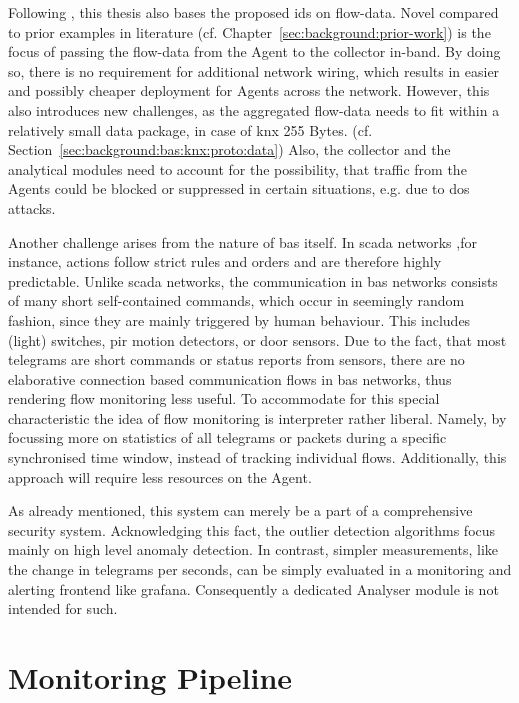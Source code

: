 Following \textcite{Celeda2012}, this thesis also bases the proposed \gls{ids} on flow-data.
Novel compared to prior examples in literature (cf. Chapter~\ref{sec:background:prior-work}) is the focus of passing the flow-data from the Agent to the collector in-band. By doing so, there is no requirement for additional network wiring, which results in easier and possibly cheaper deployment for Agents across the network.
However, this also introduces new challenges, as the aggregated flow-data needs to fit within a relatively small data package, in case of \gls{knx} 255 Bytes. (cf. Section~\ref{sec:background:bas:knx:proto:data})
Also, the collector and the analytical modules need to account for the possibility, that traffic from the Agents could be blocked or suppressed in certain situations, e.g. due to \gls{dos} attacks.

Another challenge arises from the nature of \gls{bas} itself. In \gls{scada} networks ,for instance, actions follow strict rules and orders and are therefore highly predictable. %
Unlike \gls{scada} networks, the communication in \gls{bas} networks consists of many short self-contained commands, which occur in seemingly random fashion, since they are mainly triggered by human behaviour. This includes (light) switches, \gls{pir} motion detectors, or door sensors.
Due to the fact, that most telegrams are short commands or status reports from sensors, there are no elaborative connection based communication flows in \gls{bas} networks, thus rendering flow monitoring less useful.
To accommodate for this special characteristic the idea of flow monitoring is interpreter rather liberal. 
Namely, by focussing more on statistics of all telegrams or packets during a specific synchronised time window, instead of tracking individual flows. Additionally, this approach will require less resources on the Agent.

As already mentioned, this system can merely be a part of a comprehensive security system. Acknowledging this fact, the outlier detection algorithms focus mainly on high level anomaly detection. %
In contrast, simpler measurements, like the change in telegrams per seconds, can be simply evaluated in a monitoring and alerting frontend like \gls{grafana}. Consequently a dedicated Analyser module is not intended for such.

\section{Monitoring Pipeline}
\label{sec:concept:pipeline}

